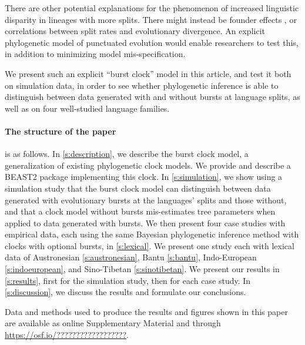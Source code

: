 \documentclass[]{rsos}%
\begin{document}
There are other potential explanations for the phenomenon of increased
linguistic disparity in lineages with more splits. There might instead be
founder effects \parencite{atkinson2008languages,greenhill2017evolutionary},
or correlations between split rates and evolutionary divergence.
An explicit phylogenetic model of punctuated evolution would enable
researchers to test this, in addition to minimizing model mis-specification.

We present such an explicit “burst clock” model in this article, and test it
both on simulation data, in order to see whether phylogenetic inference is able
to distinguish between data generated with and without bursts at language
splits, as well as on four well-studied language families.

\paragraph{The structure of the paper} is as follows. In \cref{s:description},
we describe the burst clock model, a generalization of existing phylogenetic
clock models. We provide and describe a BEAST2 \parencite{drummond2015bayesian}
package implementing this clock. In \cref{s:simulation}, we show using a
simulation study that the burst clock model can distinguish between data
generated with evolutionary bursts at the languages' splits and those without,
and that a clock model without bursts mis-estimates tree parameters when applied
to data generated with bursts. We then present four case studies with empirical
data, each using the same Bayesian phylogenetic inference method with clocks
with optional bursts, in \cref{s:lexical}. We present one study each with
lexical data of Austronesian \ref{s:austronesian}, Bantu \ref{s:bantu},
Indo-European \ref{s:indoeuropean}, and Sino-Tibetan \ref{s:sinotibetan}. We
present our results in \cref{s:results}, first for the simulation study, then
for each case study. In \cref{s:discussion}, we discuss the results and
formulate our conclusions.

Data and methods used to produce the results and figures shown in this paper are
available as online Supplementary Material and through
\url{https://osf.io/??????????????????}.
\end{document}
